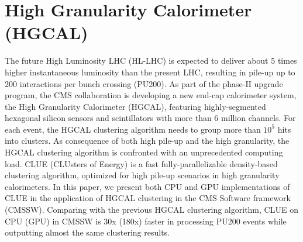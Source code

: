 \chapter{High Granularity Calorimeter (HGCAL)}
\label{sec:relatedworks}

The future High Luminosity LHC (HL-LHC) is expected to deliver about 5 times higher instantaneous luminosity than the present LHC, resulting in pile-up up to 200 interactions per bunch crossing (PU200). As part of the phase-II upgrade program, the CMS collaboration is developing a new end-cap calorimeter system, the High Granularity Calorimeter (HGCAL), featuring highly-segmented hexagonal silicon sensors and scintillators with more than 6 million channels. For each event, the HGCAL clustering algorithm needs to group more than $10^5$ hits into clusters. As consequence of both high pile-up and the high granularity, the HGCAL clustering algorithm is confronted with an unprecedented computing load. CLUE (CLUsters of Energy) is a fast fully-parallelizable density-based clustering algorithm, optimized for high pile-up scenarios in high granularity calorimeters. In this paper, we present both CPU and GPU implementations of CLUE in the application of HGCAL clustering in the CMS Software framework (CMSSW). Comparing with the previous HGCAL clustering algorithm, CLUE on CPU (GPU) in CMSSW is 30x (180x) faster in processing PU200 events while outputting almost the same clustering results.


 






